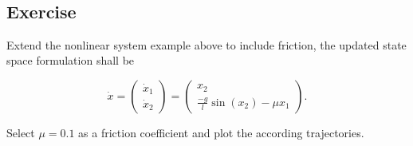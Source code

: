 \documentclass[11pt,a4paper, d]{scrartcl}
\makeatletter
\newcommand{\boxspacing}{\kern\kvtcb@left@rule\kern\kvtcb@boxsep}
\newcommand{\prompt}[4]{
        {\ttfamily\llap{{\color{#2}[#3]:\hspace{3pt}#4}}\vspace{-\baselineskip}}
    }
\makeatother
\begin{document}
    \begin{center}
    \end{center}
    { \hspace*{\fill} \\}
    
    \hypertarget{exercise}{%
\subsection{Exercise}\label{exercise}}

Extend the nonlinear system example above to include friction, the
updated state space formulation shall be

\[\dot{x} = \begin{pmatrix} \dot{x}_1 \\ \dot{x}_2 \end{pmatrix}  = \begin{pmatrix} x_2  \\ \frac{-g}{l}\sin\left(x_2\right) - \mu x_1 \end{pmatrix}.\]

Select \(\mu = 0.1\) as a friction coefficient and plot the according
trajectories.

    \begin{tcolorbox}[breakable, size=fbox, boxrule=1pt, pad at break*=1mm,colback=cellbackground, colframe=cellborder]
\prompt{In}{incolor}{ }{\boxspacing}
\begin{Verbatim}[commandchars=\\\{\}]

\end{Verbatim}
\end{tcolorbox}


    
    
    
\end{document}
